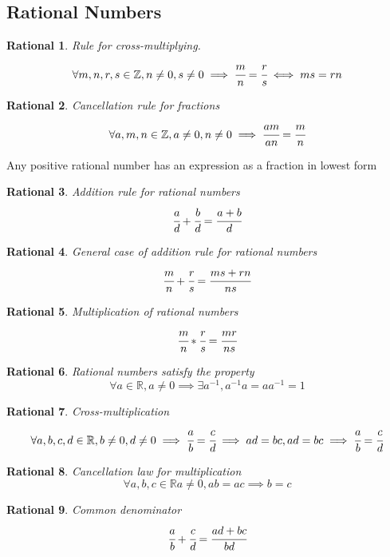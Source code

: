 \subsection{Rational Numbers}
\newtheorem{rational}{Rational}[section]
\begin{rational}
Rule for cross-multiplying.
\[
\forall m, n, r, s \in \mathbb{Z}, n \neq 0, s \neq 0 \implies \cfrac{m}{n} = \cfrac{r}{s} \iff ms = rn
\]
\end{rational}
\begin{rational}
Cancellation rule for fractions
\[
\forall a, m, n \in \mathbb{Z}, a \neq 0, n \neq 0 \implies \cfrac{am}{an} = \cfrac{m}{n}
\]
\end{rational}
\begin{theorem}
Any positive rational number has an expression as a fraction in lowest form
\end{theorem}
\begin{rational}
Addition rule for rational numbers
\[
\cfrac{a}{d} + \cfrac{b}{d} = \cfrac{a + b}{d}
\]
\end{rational}
\begin{rational}
General case of addition rule for rational numbers
\[
\cfrac{m}{n} + \cfrac{r}{s} = \cfrac{ms + rn}{ns}
\]
\end{rational}
\begin{rational}
Multiplication of rational numbers
\[
\cfrac{m}{n}*\cfrac{r}{s} = \cfrac{mr}{ns}
\]
\end{rational}
\begin{rational}
Rational numbers satisfy the property
\[
\forall a \in \mathbb{R}, a \neq 0 \implies \exists a^{-1}, a^{-1}a = aa^{-1} = 1
\]
\end{rational}
\begin{rational}
Cross-multiplication
\[
\forall a, b, c, d \in \mathbb{R}, b \neq 0, d \neq 0 \implies \cfrac{a}{b} = \cfrac{c}{d} \implies ad = bc, ad = bc \implies \cfrac{a}{b} = \cfrac{c}{d}
\]
\end{rational}
\begin{rational}
Cancellation law for multiplication
\[
\forall a, b, c \in \mathbb{R} a \neq 0, ab = ac \implies b = c
\]
\end{rational}
\begin{rational}
Common denominator
\[
\cfrac{a}{b} + \cfrac{c}{d} = \cfrac{ad + bc}{bd}
\]
\end{rational}
